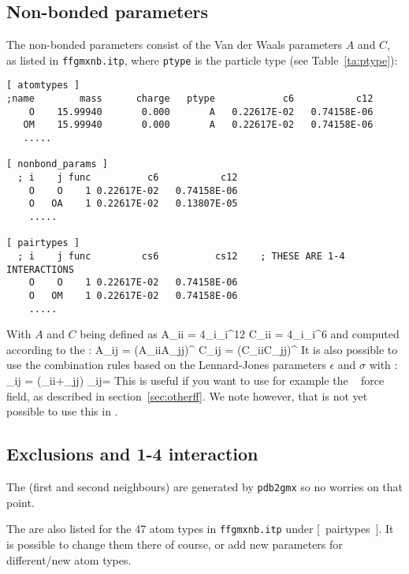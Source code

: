 \subsection{Non-bonded parameters}
\label{subsec:nbpar}
The non-bonded parameters consist of the Van der Waals parameters
$A$ and $C$, as listed in \verb'ffgmxnb.itp', where {\tt ptype} is the
particle type (see Table~\ref{ta:ptype}):
{\small\begin{verbatim}
[ atomtypes ]
;name        mass      charge   ptype            c6           c12
    O    15.99940       0.000       A   0.22617E-02   0.74158E-06
   OM    15.99940       0.000       A   0.22617E-02   0.74158E-06
   .....

[ nonbond_params ]
  ; i    j func          c6           c12
    O    O    1 0.22617E-02   0.74158E-06
    O   OA    1 0.22617E-02   0.13807E-05
    .....

[ pairtypes ]
  ; i    j func         cs6          cs12    ; THESE ARE 1-4 INTERACTIONS
    O    O    1 0.22617E-02   0.74158E-06
    O   OM    1 0.22617E-02   0.74158E-06
    .....
\end{verbatim}}
With $A$ and $C$ being defined as
\beq
	A_{ii} = 4\epsilon_i\sigma_i^{12}
\eeq
\beq
	C_{ii} = 4\epsilon_i\sigma_i^{6}
\eeq
and computed according to the  :
\beq
	A_{ij} = (A_{ii}A_{jj})^{}
\eeq
\beq
	C_{ij} = (C_{ii}C_{jj})^{}
\eeq
It is also possible to use the combination rules based on the
Lennard-Jones parameters $\epsilon$ and $\sigma$ with : 
\beq
 	\sigma_{ij} = (\sigma_{ii}+\sigma_{jj})
\eeq
\beq
 	\epsilon_{ij}=
\eeq
This is useful if you want to use for example the
~\cite{Jorgensen88} force field, as described in
section~\ref{sec:otherff}. We note however, that is not yet possible
to use this in {\gromacs} {\gmxver}.

\subsection{Exclusions and 1-4 interaction}
The  (first and second neighbours) are generated by
\verb'pdb2gmx' so no worries on that point.

The  are also listed for the 47 atom types in
\verb'ffgmxnb.itp' under [~pairtypes~]. It is possible to change them there
of course, or add new parameters for different/new atom types.

